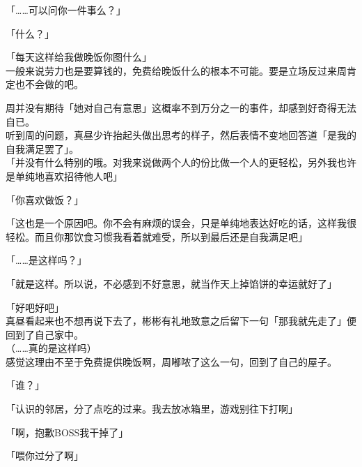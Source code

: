 「……可以问你一件事么？」

「什么？」

「每天这样给我做晚饭你图什么」\\

一般来说劳力也是要算钱的，免费给晚饭什么的根本不可能。要是立场反过来周肯定也不会做的吧。

周并没有期待「她对自己有意思」这概率不到万分之一的事件，却感到好奇得无法自已。\\

听到周的问题，真昼少许抬起头做出思考的样子，然后表情不变地回答道「是我的自我满足罢了」。\\

「并没有什么特别的哦。对我来说做两个人的份比做一个人的更轻松，另外我也许是单纯地喜欢招待他人吧」

「你喜欢做饭？」

「这也是一个原因吧。你不会有麻烦的误会，只是单纯地表达好吃的话，这样我很轻松。而且你那饮食习惯我看着就难受，所以到最后还是自我满足吧」

「……是这样吗？」

「就是这样。所以说，不必感到不好意思，就当作天上掉馅饼的幸运就好了」

「好吧好吧」\\

真昼看起来也不想再说下去了，彬彬有礼地致意之后留下一句「那我就先走了」便回到了自己家中。\\

（……真的是这样吗）\\

感觉这理由不至于免费提供晚饭啊，周嘟哝了这么一句，回到了自己的屋子。\\

\vspace{2\baselineskip}

「谁？」

「认识的邻居，分了点吃的过来。我去放冰箱里，游戏别往下打啊」

「啊，抱歉BOSS我干掉了」

「喂你过分了啊」
